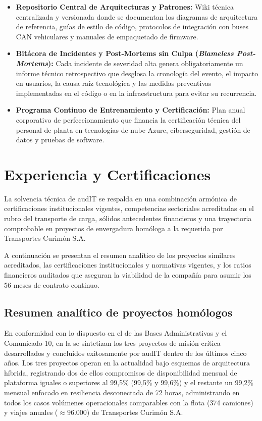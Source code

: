 \begin{itemize}
  \item \textbf{Repositorio Central de Arquitecturas y Patrones:} Wiki técnica centralizada y versionada donde se documentan los diagramas de arquitectura de referencia, guías de estilo de código, protocolos de integración con buses CAN vehiculares y manuales de empaquetado de firmware.
  \item \textbf{Bitácora de Incidentes y Post-Mortems sin Culpa (\textit{Blameless Post-Mortems}):} Cada incidente de severidad alta genera obligatoriamente un informe técnico retrospectivo que desglosa la cronología del evento, el impacto en usuarios, la causa raíz tecnológica y las medidas preventivas implementadas en el código o en la infraestructura para evitar su recurrencia.
  \item \textbf{Programa Continuo de Entrenamiento y Certificación:} Plan anual corporativo de perfeccionamiento que financia la certificación técnica del personal de planta en tecnologías de nube Azure, ciberseguridad, gestión de datos y pruebas de software.
\end{itemize}

\section{Experiencia y Certificaciones}\label{sec:1-experiencia}

La solvencia técnica de audIT se respalda en una combinación armónica de certificaciones institucionales vigentes, competencias sectoriales acreditadas en el rubro del transporte de carga, sólidos antecedentes financieros y una trayectoria comprobable en proyectos de envergadura homóloga a la requerida por Transportes Curimón S.A.

A continuación se presentan el resumen analítico de los proyectos similares acreditados, las certificaciones institucionales y normativas vigentes, y los ratios financieros auditados que aseguran la viabilidad de la compañía para asumir los 56 meses de contrato continuo.

\subsection{Resumen analítico de proyectos homólogos}\label{sec:1-proyectos-homologos}

En conformidad con lo dispuesto en el  de las Bases Administrativas y el Comunicado 10, en la  se sintetizan los tres proyectos de misión crítica desarrollados y concluidos exitosamente por audIT dentro de los últimos cinco años. Los tres proyectos operan en la actualidad bajo esquemas de arquitectura híbrida, registrando dos de ellos compromisos de disponibilidad mensual de plataforma iguales o superiores al 99,5\% (99,5\% y 99,6\%) y el restante un 99,2\% mensual enfocado en resiliencia desconectada de 72 horas, administrando en todos los casos volúmenes operacionales comparables con la flota (374 camiones) y viajes anuales ($\approx 96.000$) de Transportes Curimón S.A.


